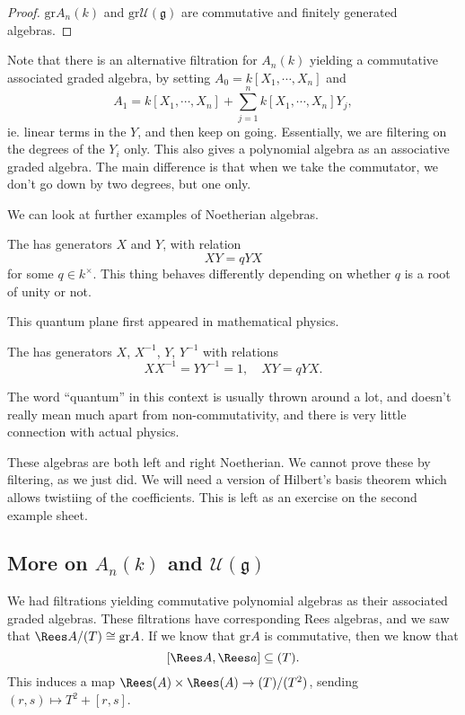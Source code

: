 \documentclass[a4paper]{article}
\renewcommand\Gr{\mathrm{gr}}
\begin{document}
\begin{proof}
  $\Gr A_n(k)$ and $\Gr \mathcal{U}(\mathfrak{g})$ are commutative and finitely generated algebras.
\end{proof}

Note that there is an alternative filtration for $A_n(k)$ yielding a commutative associated graded algebra, by setting $A_0 = k[X_1, \cdots, X_n]$ and
\[
  A_1 = k[X_1, \cdots, X_n] + \sum_{j = 1}^n k[X_1, \cdots, X_n] Y_j,
\]
ie. linear terms in the $Y$, and then keep on going. Essentially, we are filtering on the degrees of the $Y_i$ only. This also gives a polynomial algebra as an associative graded algebra. The main difference is that when we take the commutator, we don't go down by two degrees, but one only.

We can look at further examples of Noetherian algebras.
\begin{eg}
  The   has generators $X$ and $Y$, with relation
  \[
    XY = q YX
  \]
  for some $q \in k^\times$. This thing behaves differently depending on whether $q$ is a root of unity or not.
\end{eg}
This quantum plane first appeared in mathematical physics.
\begin{eg}
  The   has generators $X$, $X^{-1}$, $Y$, $Y^{-1}$ with relations
  \[
    XX^{-1} = YY^{-1} = 1,\quad XY = q YX.
  \]
\end{eg}
The word ``quantum'' in this context is usually thrown around a lot, and doesn't really mean much apart from non-commutativity, and there is very little connection with actual physics.

These algebras are both left and right Noetherian. We cannot prove these by filtering, as we just did. We will need a version of Hilbert's basis theorem which allows twistiing of the coefficients. This is left as an exercise on the second example sheet.

\subsection{More on \texorpdfstring{$A_n(k)$}{An(k)} and \texorpdfstring{$\mathcal{U}(\mathfrak{g})$}{U(g)}}
We had filtrations yielding commutative polynomial algebras as their associated graded algebras. These filtrations have corresponding Rees algebras, and we saw that $\Rees A / (T) \cong \Gr A$. If we know that $\Gr A$ is commutative, then we know that
\[
  [\Rees A, \Rees a] \subseteq (T).
\]
This induces a map $\Rees (A) \times \Rees (A) \to (T)/(T^2)$, sending $(r, s) \mapsto T^2 + [r, s]$.
\end{document}
